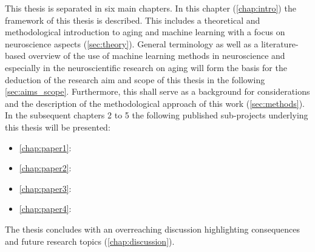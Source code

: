 This thesis is separated in six main chapters. In this chapter (\autoref{chap:intro}) the framework of this thesis is described. This includes a theoretical and methodological introduction to aging and machine learning with a focus on neuroscience aspects (\autoref{sec:theory}). General terminology as well as a literature-based overview of the use of machine learning methods in neuroscience and especially in the neuroscientific research on aging will form the basis for the deduction of the research aim and scope of this thesis in the following \autoref{sec:aims_scope}. Furthermore, this shall serve as a background for considerations and the description of the methodological approach of this work (\autoref{sec:methods}). In the subsequent chapters 2 to 5 the following published sub-projects underlying this thesis will be presented:

\begin{itemize}
\item \autoref{chap:paper1}: 
\item \autoref{chap:paper2}: 
\item \autoref{chap:paper3}: 
\item \autoref{chap:paper4}: 
\end{itemize}

The thesis concludes with an overreaching discussion highlighting consequences and future research topics (\autoref{chap:discussion}).
